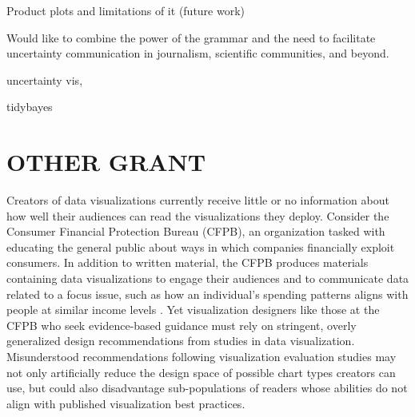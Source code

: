 \documentclass[11pt]{article}
\begin{document}
Product plots and limitations of it \cite{wickham_product_2011} (future work)


Would like to combine the power of the grammar and the need to facilitate uncertainty communication in journalism, scientific communities, and beyond.











uncertainty vis, \cite{kale2018hypothetical} \cite{kay2016bus, Fernandes2018}

tidybayes








\section{OTHER GRANT}
\setcounter{section}{1}

Creators of data visualizations currently receive little or no information about how well their audiences can read the visualizations they deploy.
Consider the Consumer Financial Protection Bureau (CFPB), an organization tasked with educating the general public about ways in which companies financially exploit consumers.
In addition to written material, the CFPB produces materials containing data visualizations to engage their audiences and to communicate data related to a focus issue, such as how an individual's spending patterns aligns with people at similar income levels \cite{cesal2017find}.
Yet visualization designers like those at the CFPB who seek evidence-based guidance must rely on stringent, overly generalized design recommendations from studies in data visualization.
Misunderstood recommendations following visualization evaluation studies may not only artificially reduce the design space of possible chart types creators can use, but could also disadvantage sub-populations of readers whose abilities do not align with published visualization best practices.
\end{document}
